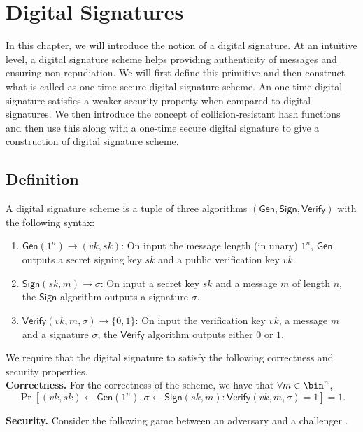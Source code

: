 \documentclass[12pt]{tufte-book}
\newcommand{\Gen}{\mathsf{Gen}}
\newcommand{\Sign}{\mathsf{Sign}}
\newcommand{\Verify}{\mathsf{Verify}}
\begin{document}
 

\chapter{Digital Signatures}

In this chapter, we will introduce the notion of a digital signature. At an intuitive level, a digital signature scheme helps providing authenticity of messages and ensuring non-repudiation. We will first define this primitive and then construct what is called as one-time secure digital signature scheme. An one-time digital signature satisfies a weaker security property when compared to digital signatures. We then introduce the concept of collision-resistant hash functions and then use this along with a one-time secure digital signature to give a construction of digital signature scheme.

\section{Definition}

A digital signature scheme is a tuple of three algorithms $(\Gen,\Sign,\Verify)$ with the following syntax:
\begin{enumerate}
\item $\Gen(1^n)\to (vk,sk)$: On input the message length (in unary) $1^n$, $\Gen$ outputs a secret signing key $sk$ and a public verification key $vk$.
\item $\Sign(sk, m) \to \sigma$: On input a secret key $sk$ and a message $m$ of length $n$, the $\Sign$ algorithm outputs a signature $\sigma$.
\item $\Verify(vk, m, \sigma) \to \{0,1\}$: On input the verification key $vk$, a message $m$ and a signature $\sigma$, the $\Verify$ algorithm outputs either $0$ or $1$.
\end{enumerate}

We require that the digital signature to satisfy the following correctness and security properties.\\
\medskip
\noindent\textbf{Correctness.} For the correctness of the scheme, we have that
$\forall m \in \bin^n$,
\[\Pr \left[ (vk,sk) \gets \Gen(1^n), \sigma \leftarrow \Sign(sk,m) : \Verify(vk, m, \sigma) = 1 \right] = 1.\]

\medskip
\noindent\textbf{Security.} Consider the following game between an adversary and a challenger
.
\end{document}

